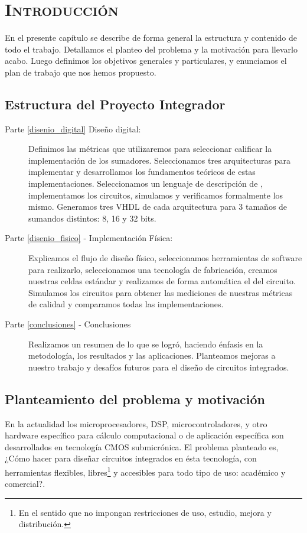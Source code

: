 \chapter{ \textsc{ Introducción } }
En el presente capítulo se describe de forma general la estructura y contenido de todo el trabajo. Detallamos el planteo del problema y la motivación para llevarlo acabo. Luego definimos los objetivos generales y particulares, y enunciamos el plan de trabajo que nos hemos propuesto.
\section{Estructura del Proyecto Integrador}

\begin{description}
\item[Parte \ref{disenio_digital} Diseño digital:] Definimos las métricas que utilizaremos para seleccionar calificar la implementación de los sumadores. Seleccionamos tres arquitecturas para implementar y desarrollamos los fundamentos teóricos de estas implementaciones. Seleccionamos un lenguaje de descripción de , implementamos los circuitos, simulamos y verificamos formalmente los mismo. Generamos tres \netlist VHDL de cada arquitectura para 3 tamaños de sumandos distintos: 8, 16 y 32 bits.
\item[Parte \ref{disenio_fisico} - Implementación Física:] Explicamos el flujo de diseño físico, seleccionamos herramientas de software para realizarlo, seleccionamos una tecnología de fabricación, creamos nuestras celdas estándar y realizamos de forma automática el \layout del circuito. Simulamos los circuitos para obtener las mediciones de nuestras métricas de calidad y comparamos todas las implementaciones.
\item[Parte \ref{conclusiones} - Conclusiones] Realizamos un resumen de lo que se logró, haciendo énfasis en la metodología, los resultados y las aplicaciones. Planteamos mejoras a nuestro trabajo y desafíos futuros para el diseño de circuitos integrados.
\end{description}


\section{Planteamiento del problema y motivación}
En la actualidad los microprocesadores, DSP, microcontroladores, y otro hardware específico para cálculo computacional o de aplicación específica son desarrollados en tecnología CMOS submicrónica. El problema planteado es, ¿Cómo hacer para diseñar circuitos integrados en ésta tecnología, con herramientas flexibles, libres\footnote{En el sentido que no impongan restricciones de uso, estudio, mejora y distribución.} y accesibles para todo tipo de uso: académico y comercial?.

